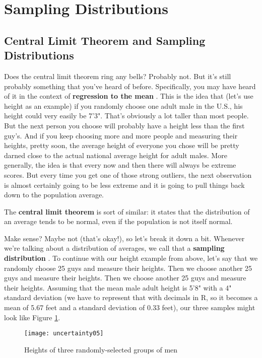 \section{Sampling Distributions}

\subsection{Central Limit Theorem and Sampling Distributions}
Does the central limit theorem ring any bells? Probably not. But it's still probably something that you've heard of before. Specifically, you may have heard of it in the context of \textbf{regression to the mean} . This is the idea that (let's use height as an example) if you randomly choose one adult male in the U.S., his height could very easily be 7'3". That's obviously a lot taller than most people. But the next person you choose will probably have a height less than the first guy's. And if you keep choosing more and more people and measuring their heights, pretty soon, the average height of everyone you chose will be pretty darned close to the actual national average height for adult males. More generally, the idea is that every now and then there will always be extreme scores. But every time you get one of those strong outliers, the next observation is almost certainly going to be less extreme and it is going to pull things back down to the population average.

The \textbf{central limit theorem}  is sort of similar: it states that the distribution of an average tends to be normal, even if the population is not itself normal.

Make sense? Maybe not (that's okay!), so let's break it down a bit. Whenever we're talking about a distribution of averages, we call that a \textbf{sampling distribution} . To continue with our height example from above, let's say that we randomly choose 25 guys and measure their heights. Then we choose another 25 guys and measure their heights. Then we choose another 25 guys and measure their heights. Assuming that the mean male adult height is 5'8" with a 4" standard deviation (we have to represent that with decimals in R, so it becomes a mean of 5.67 feet and a standard deviation of 0.33 feet), our three samples might look like Figure \ref{fig:uncertainty05}.

\begin{figure}[h!]
\texttt{[image: uncertainty05]}
\caption{Heights of three randomly-selected groups of men}
\label{fig:uncertainty05}
\end{figure}

